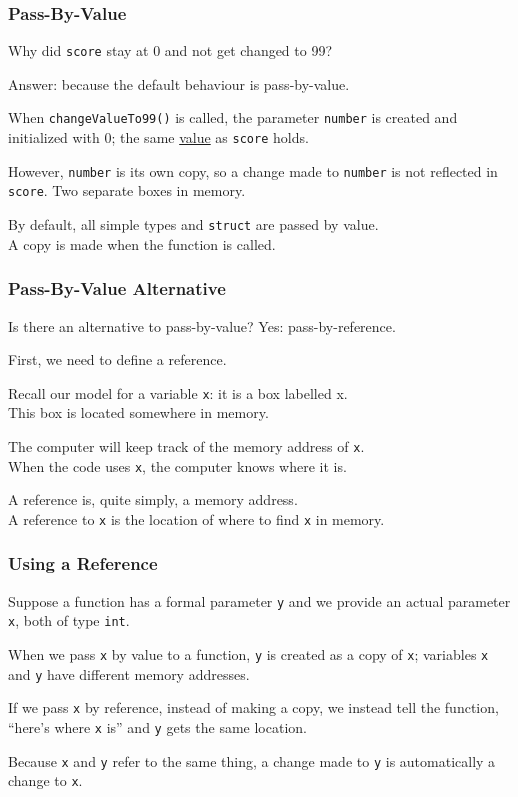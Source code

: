 \begin{frame}
\frametitle{Pass-By-Value}
Why did \texttt{score} stay at 0 and not get changed to 99?

Answer: because the default behaviour is \alert{pass-by-value}.

When \texttt{changeValueTo99()} is called, the parameter \texttt{number} is created and initialized with 0; the same \underline{value} as \texttt{score} holds.

However, \texttt{number} is its own copy, so a change made to \texttt{number} is not reflected in \texttt{score}. Two separate boxes in memory.

By default, all simple types and \texttt{struct} are passed by value.\\
\quad A copy is made when the function is called.

\end{frame}

\begin{frame}
\frametitle{Pass-By-Value Alternative}
Is there an alternative to pass-by-value? Yes: \alert{pass-by-reference}.

First, we need to define a \alert{reference}.

Recall our model for a variable \texttt{x}: it is a box labelled x.\\
\quad This box is located somewhere in memory.

The computer will keep track of the memory address of \texttt{x}.\\
\quad When the code uses \texttt{x}, the computer knows where it is.

A reference is, quite simply, a memory address.\\
\quad A reference to \texttt{x} is the location of where to find \texttt{x} in memory.

\end{frame}

\begin{frame}
\frametitle{Using a Reference}
Suppose a function has a formal parameter \texttt{y} and we provide an actual parameter \texttt{x}, both of type \texttt{int}.

When we pass \texttt{x} by value to a function, \texttt{y} is created as a copy of \texttt{x}; variables \texttt{x} and \texttt{y} have different memory addresses.

If we pass \texttt{x} by reference, instead of making a copy, we instead tell the function, ``here's where \texttt{x} is'' and \texttt{y} gets the same location.

Because \texttt{x} and \texttt{y} refer to the same thing, a change made to \texttt{y} is automatically a change to \texttt{x}.

\end{frame}

